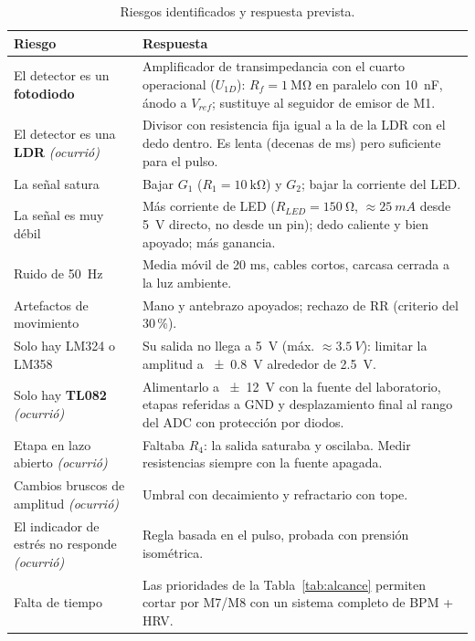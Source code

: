 \documentclass[11pt,a4paper]{article}
\begin{document}
\begin{table}[H]
\centering\small
\caption{Riesgos identificados y respuesta prevista.}
\label{tab:riesgos}
\begin{tabularx}{\textwidth}{>{\raggedright\arraybackslash}p{4.2cm}X}
\toprule
Riesgo & Respuesta \\
\midrule
El detector es un \textbf{fotodiodo} & Amplificador de transimpedancia con el cuarto
operacional ($U_{1D}$): $R_f = \qty{1}{\mega\ohm}$ en paralelo con \qty{10}{\nano\farad},
ánodo a $V_{ref}$; sustituye al seguidor de emisor de M1. \\
El detector es una \textbf{LDR} \emph{(ocurrió)} & Divisor con resistencia fija igual a la de la LDR con el dedo
dentro. Es lenta (decenas de ms) pero suficiente para el pulso. \\
La señal satura & Bajar $G_1$ ($R_1 = \qty{10}{\kilo\ohm}$) y $G_2$; bajar la corriente del LED. \\
La señal es muy débil & Más corriente de LED ($R_{LED} = \qty{150}{\ohm}$, $\approx \qty{25}{mA}$ desde \qty{5}{V} directo, no desde un pin); dedo caliente y bien apoyado; más ganancia. \\
Ruido de \qty{50}{Hz} & Media móvil de 20 ms, cables cortos, carcasa cerrada a la luz ambiente. \\
Artefactos de movimiento & Mano y antebrazo apoyados; rechazo de RR (criterio del 30\,\%). \\
Solo hay LM324 o LM358 & Su salida no llega a \qty{5}{V} (máx. $\approx \qty{3.5}{V}$): limitar la amplitud a \qty{\pm 0.8}{V} alrededor de \qty{2.5}{V}. \\
Solo hay \textbf{TL082} \emph{(ocurrió)} & Alimentarlo a \qty{\pm 12}{V} con la fuente del laboratorio, etapas referidas a GND y desplazamiento final al rango del ADC con protección por diodos. \\
Etapa en lazo abierto \emph{(ocurrió)} & Faltaba $R_4$: la salida saturaba y oscilaba. Medir resistencias siempre con la fuente apagada. \\
Cambios bruscos de amplitud \emph{(ocurrió)} & Umbral con decaimiento y refractario con tope. \\
El indicador de estrés no responde \emph{(ocurrió)} & Regla basada en el pulso, probada con prensión isométrica. \\
Falta de tiempo & Las prioridades de la Tabla~\ref{tab:alcance} permiten cortar por M7/M8 con un sistema completo de BPM + HRV. \\
\bottomrule
\end{tabularx}
\end{table}
\end{document}
